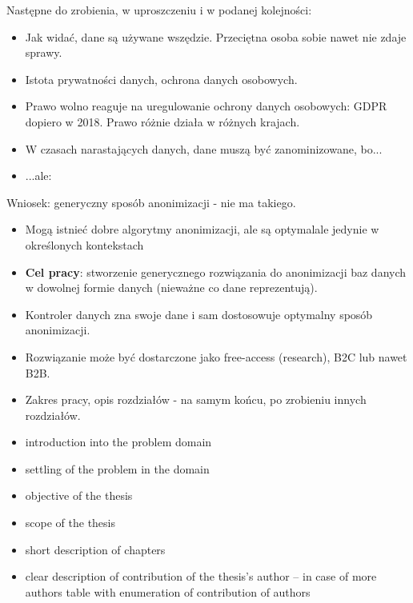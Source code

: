 \documentclass[a4paper,twoside,12pt]{book}
\begin{document}
\vfill

\footnotesize
\color{blue}
Następne do zrobienia, w uproszczeniu i w podanej kolejności:
\begin{itemize}
\item Jak widać, dane są używane wszędzie. Przeciętna osoba sobie nawet nie zdaje sprawy.
\item Istota prywatności danych, ochrona danych osobowych.
\item Prawo wolno reaguje na uregulowanie ochrony danych osobowych: GDPR dopiero w 2018. Prawo różnie działa w różnych krajach.
\item W czasach narastających danych, dane muszą być zanominizowane, bo...
\item ...ale:
\end{itemize}

\normalsize
\color{black}

\footnotesize
\color{blue}
Wniosek: generyczny sposób anonimizacji - nie ma takiego.

\begin{itemize}
\item Mogą istnieć dobre algorytmy anonimizacji, ale są optymalale jedynie w określonych kontekstach

\item \textbf{Cel pracy}: stworzenie generycznego rozwiązania do anonimizacji baz danych w dowolnej formie danych (nieważne co dane reprezentują).

\item Kontroler danych zna swoje dane i sam dostosowuje optymalny sposób anonimizacji.

\item Rozwiązanie może być dostarczone jako free-access (research), B2C lub nawet B2B.

\item Zakres pracy, opis rozdziałów - na samym końcu, po zrobieniu innych rozdziałów.
\normalsize

\end{itemize}
\color{black}
\normalsize


\begin{itemize}
\item introduction into the problem domain
\item settling of the problem in the domain
\item objective of the thesis 
\item scope of the thesis
\item short description of chapters
\item clear description of contribution of the thesis's author – in case of more authors table with enumeration of contribution of authors
\end{itemize}
\end{document}

